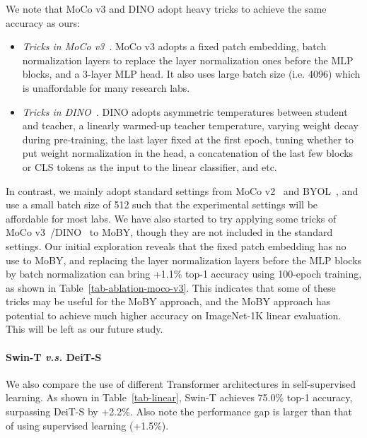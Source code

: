 \documentclass{article}
\begin{document}
We note that MoCo v3 and DINO adopt heavy tricks to achieve the same accuracy as ours:
\begin{itemize}
    \item \emph{Tricks in MoCo v3~\citep{mocov3}}. MoCo v3 adopts a fixed patch embedding, batch normalization layers to replace the layer normalization ones before the MLP blocks, and a 3-layer MLP head. It also uses large batch size (i.e. 4096) which is unaffordable for many research labs. 
    \item \emph{Tricks in DINO~\citep{dino}}. DINO adopts asymmetric temperatures between student and teacher, a linearly warmed-up teacher temperature, varying weight decay during pre-training, the last layer fixed at the first epoch, tuning whether to put weight normalization in the head, a concatenation of the last few blocks or CLS tokens as the input to the linear classifier, and etc.
\end{itemize}

In contrast, we mainly adopt standard settings from MoCo v2~\citep{mocov2} and BYOL~\citep{byol}, and use a small batch size of 512 such that the experimental settings will be affordable for most labs. We have also started to try applying some tricks of MoCo v3~\citep{mocov3}/DINO~\citep{dino} to MoBY, though they are not included in the standard settings. Our initial exploration reveals that the fixed patch embedding has no use to MoBY, and replacing the layer normalization layers before the MLP blocks by batch normalization can bring +1.1\% top-1 accuracy using 100-epoch training, as shown in Table~\ref{tab-ablation-moco-v3}. This indicates that some of these tricks may be useful for the MoBY approach, and the MoBY approach has potential to achieve much higher accuracy on ImageNet-1K linear evaluation. This will be left as our future study.

\paragraph{Swin-T \textit{v.s.} DeiT-S} We also compare the use of different Transformer architectures in self-supervised learning. As shown in Table~\ref{tab-linear}, Swin-T achieves 75.0\% top-1 accuracy, surpassing DeiT-S by +2.2\%. Also note the performance gap is larger than that of using supervised learning (+1.5\%).
\end{document}
